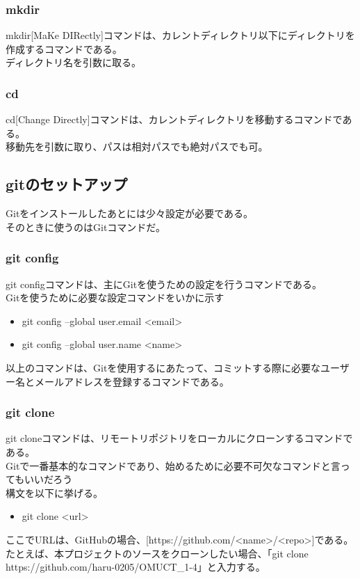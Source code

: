 \documentclass{ltjsarticle}
\begin{document}
\subsubsection{mkdir}
mkdir[MaKe DIRectly]コマンドは、カレントディレクトリ以下にディレクトリを作成するコマンドである。\\
ディレクトリ名を引数に取る。
\subsubsection{cd}
cd[Change Directly]コマンドは、カレントディレクトリを移動するコマンドである。\\
移動先を引数に取り、パスは相対パスでも絶対パスでも可。
\subsection{gitのセットアップ}
Gitをインストールしたあとには少々設定が必要である。\\
そのときに使うのはGitコマンドだ。\\
\subsubsection{git config}
git configコマンドは、主にGitを使うための設定を行うコマンドである。\\
Gitを使うために必要な設定コマンドをいかに示す
\begin{itemize}
    \item git config --global user.email <email>
    \item git config --global user.name <name>
\end{itemize}
以上のコマンドは、Gitを使用するにあたって、コミットする際に必要なユーザー名とメールアドレスを登録するコマンドである。
\subsubsection{git clone}
git cloneコマンドは、リモートリポジトリをローカルにクローンするコマンドである。\\
Gitで一番基本的なコマンドであり、始めるために必要不可欠なコマンドと言ってもいいだろう\\
構文を以下に挙げる。
\begin{itemize}
    \item git clone <url>
\end{itemize}
ここでURLは、GitHubの場合、[https://github.com/<name>/<repo>]である。\\
たとえば、本プロジェクトのソースをクローンしたい場合、「git clone https://github.com/haru-0205/OMUCT\_1-4」と入力する。
\end{document}
